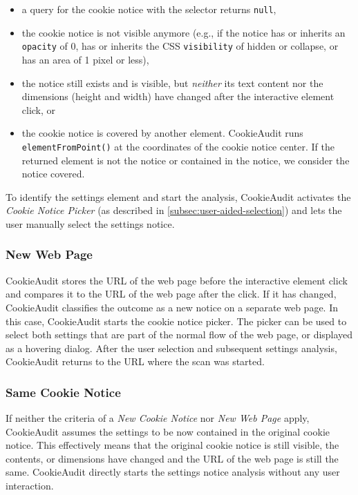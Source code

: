 \begin{itemize} 
    \item a query for the cookie notice with the selector returns \texttt{null},
    \item the cookie notice is not visible anymore (e.g., if the notice has or inherits an \texttt{opacity} of 0, has or inherits the CSS \texttt{visibility} of hidden or collapse, or has an area of 1 pixel or less),
    \item the notice still exists and is visible, but \emph{neither} its text content nor the dimensions (height and width) have changed after the interactive element click, or
    \item the cookie notice is covered by another element. CookieAudit runs \texttt{elementFromPoint()} at the coordinates of the cookie notice center. If the returned element is not the notice or contained in the notice, we consider the notice covered.
\end{itemize}

To identify the settings element and start the analysis, CookieAudit activates the \emph{Cookie Notice Picker} (as described in \cref{subsec:user-aided-selection}) and lets the user manually select the settings notice.

\subsubsection{New Web Page}
CookieAudit stores the URL of the web page before the interactive element click and compares it to the URL of the web page after the click.
If it has changed, CookieAudit classifies the outcome as a new notice on a separate web page.
In this case, CookieAudit starts the cookie notice picker. 
The picker can be used to select both settings that are part of the normal flow of the web page, or displayed as a hovering dialog.
After the user selection and subsequent settings analysis, CookieAudit returns to the URL where the scan was started.

\subsubsection{Same Cookie Notice}
If neither the criteria of a \emph{New Cookie Notice} nor \emph{New Web Page} apply, CookieAudit assumes the settings to be now contained in the original cookie notice.
This effectively means that the original cookie notice is still visible, the contents, or dimensions have changed and the URL of the web page is still the same.
CookieAudit directly starts the settings notice analysis without any user interaction.

